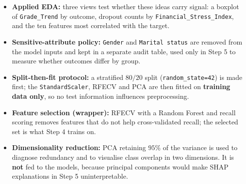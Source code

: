\documentclass[11pt]{article}
\providecommand{\tightlist}{%
      \setlength{\itemsep}{0pt}\setlength{\parskip}{0pt}}
\begin{document}
\begin{itemize}
\begin{itemize}
    \begin{itemize}
    \tightlist
    \item
      \emph{Approval rate:}
      \(\text{Approval\_Rate}_s = \frac{\text{Units Approved}_s}{\text{Units Enrolled}_s + 10^{-5}}\)
      for each semester \(s\).
    \item
      \emph{Academic momentum:}
      \(\text{Grade\_Trend} = \text{Grade}_{\text{Sem2}} - \text{Grade}_{\text{Sem1}}\).
    \item
      \emph{Financial stress:}
      \(\text{Debtor} + (1 - \text{Tuition Up To Date}) + (1 - \text{Scholarship Holder})\).
    \end{itemize}
  \item
    \textbf{Applied EDA:} three views test whether these ideas carry
    signal: a boxplot of \texttt{Grade\_Trend} by outcome, dropout
    counts by \texttt{Financial\_Stress\_Index}, and the ten features
    most correlated with the target.
  \item
    \textbf{Sensitive-attribute policy:} \texttt{Gender} and
    \texttt{Marital\ status} are removed from the model inputs and kept
    in a separate audit table, used only in Step 5 to measure whether
    outcomes differ by group.
  \item
    \textbf{Split-then-fit protocol:} a stratified \(80/20\) split
    (\texttt{random\_state=42}) is made first; the
    \texttt{StandardScaler}, RFECV and PCA are then fitted on
    \textbf{training data only}, so no test information influences
    preprocessing.
  \item
    \textbf{Feature selection (wrapper):} RFECV with a Random Forest and
    recall scoring removes features that do not help cross-validated
    recall; the selected set is what Step 4 trains on.
  \item
    \textbf{Dimensionality reduction:} PCA retaining \(95\%\) of the
    variance is used to diagnose redundancy and to visualise class
    overlap in two dimensions. It is \textbf{not} fed to the models,
    because principal components would make SHAP explanations in Step 5
    uninterpretable.
  \end{itemize}
\end{itemize}
\end{document}
